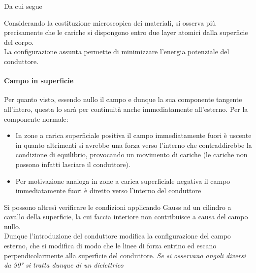 
Da cui segue


Considerando la costituzione microscopica dei materiali, si osserva più precisamente che le cariche si dispongono entro due layer atomici dalla superficie del corpo.
\\La configurazione assunta permette di minimizzare l'energia potenziale del conduttore.

\paragraph{Campo in superficie}
Per quanto visto, essendo nullo il campo e dunque la sua componente tangente all'intero, questa lo sarà per continuità anche immediatamente all'esterno. Per la componente normale:
\begin{itemize}
\item In zone a carica superficiale positiva il campo immediatamente fuori è uscente in quanto altrimenti si avrebbe una forza verso l'interno che contraddirebbe la condizione di equilibrio, provocando un movimento di cariche (le cariche non possono infatti lasciare il conduttore).
\item Per motivazione analoga in zone a carica superficiale negativa il campo immediatamente fuori è diretto verso l'interno del conduttore
\end{itemize}
Si possono altresì verificare le condizioni applicando Gauss ad un cilindro a cavallo della superficie, la cui faccia interiore non contribuisce a causa del campo nullo.
\\Dunque l'introduzione del conduttore modifica la configurazione del campo esterno, che si modifica di modo che le linee di forza entrino ed escano perpendicolarmente alla superficie del conduttore. \textit{Se si osservano angoli diversi da 90° si tratta dunque di un dielettrico}


